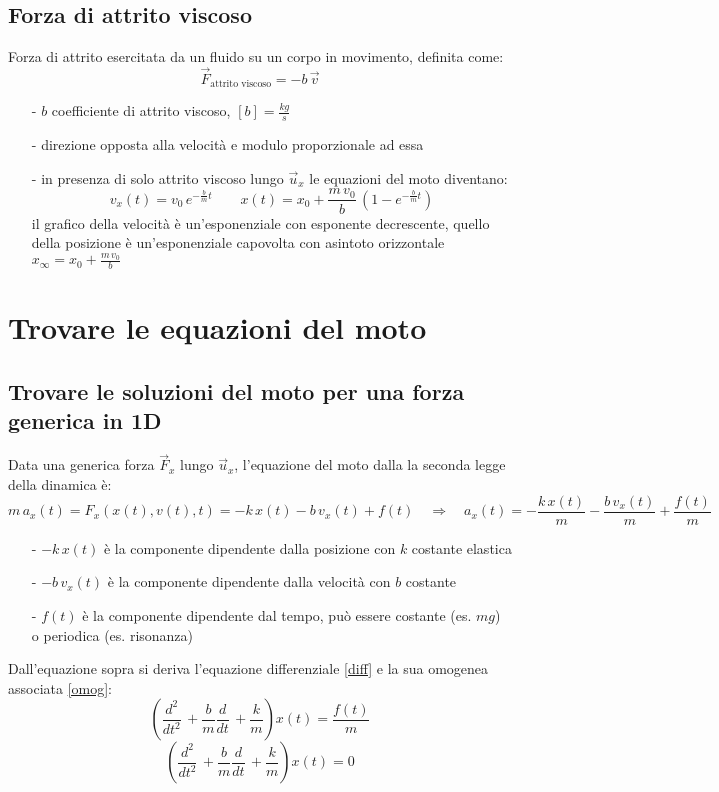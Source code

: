 \documentclass[a4paper]{article}
\newcommand\ux{\vec{u}_x}
\newcommand\dt{\frac{d}{dt}\,}
\newcommand\dts{\frac{d^2}{dt^2}\,}
\begin{document}
\subsection{Forza di attrito viscoso}
Forza di attrito esercitata da un fluido su un corpo in movimento, definita come:
\[\vec{F}_\text{attrito viscoso} = - b \, \vec{v}\]
\begin{itemize}[topsep=3pt, itemsep=0pt]
	\item[-] \(b\) coefficiente di attrito viscoso, \(\left[b\right] = \frac{kg}{s}\)
	\item[-] direzione opposta alla velocità e modulo proporzionale ad essa
	\item[-] in presenza di solo attrito viscoso lungo \(\ux\) le equazioni del moto diventano:
	\[v_x(t) = v_0 \, e^{-\frac{b}{m}t} \qquad x(t) = x_0 + \frac{m \, v_0}{b} \, \left(1-e^{-\frac{b}{m}t}\right)\]
	il grafico della velocità è un'esponenziale con esponente decrescente, quello della posizione è un'esponenziale capovolta con asintoto orizzontale \(x_{\infty} = x_0 + \frac{m \, v_0}{b}\)
\end{itemize}

\newpage


\section{Trovare le equazioni del moto}
\subsection{Trovare le soluzioni del moto per una forza generica in 1D}
Data una generica forza \(\vec{F}_x\) lungo \(\ux\), l'equazione del moto dalla la seconda legge della dinamica è:
\[m \, a_x(t) = F_x(x(t), v(t), t) = -k \, x(t) - b \, v_x(t) + f(t) \quad \Rightarrow \quad a_x(t) = -\frac{k \, x(t)}{m} - \frac{b \, v_x(t)}{m} + \frac{f(t)}{m}\]
\begin{itemize}[topsep=3pt, itemsep=0pt]
	\item[-] \(-k \, x(t)\) è la componente dipendente dalla posizione con \(k\) costante elastica
	\item[-] \(-b \, v_x(t)\) è la componente dipendente dalla velocità con \(b\) costante
	\item[-] \(f(t)\) è la componente dipendente dal tempo, può essere costante (es. \(mg\)) o periodica (es. risonanza)
\end{itemize}

Dall'equazione sopra si deriva l'equazione differenziale \eqref{diff} e la sua omogenea associata \eqref{omog}:
\begin{equation}
	\label{diff}
	\left(\dts + \frac{b}{m} \dt + \frac{k}{m}\right) x(t) = \frac{f(t)}{m}
\end{equation}
\begin{equation}
	\label{omog}
	\left(\dts + \frac{b}{m} \dt + \frac{k}{m}\right) x(t) = 0
\end{equation}
\end{document}
